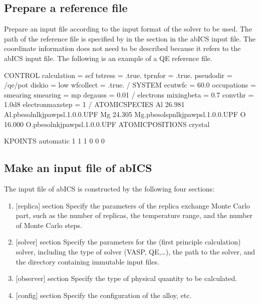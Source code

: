 \documentclass[letterpaper,10pt,english]{sphinxmanual}
\begin{document}
\subsection{Prepare a reference file}
\label{\detokenize{how_to_use/basic_usage:prepare-a-reference-file}}
Prepare an input file according to the input format of the solver to be used.
The path of the reference file is specified by  in the \sphinxcode{{[}solver{]}} section in the abICS input file.
The coordinate information does not need to be described because it refers to the abICS input file.
The following is an example of a QE reference file.

\begin{sphinxVerbatim}[commandchars=\\\{\}]
\PYGZam{}CONTROL
  calculation = \PYGZsq{}scf\PYGZsq{}
  tstress = .true.
  tprnfor = .true.
  pseudo\PYGZus{}dir = \PYGZsq{}\PYGZti{}/qe/pot\PYGZsq{}
  disk\PYGZus{}io = \PYGZsq{}low\PYGZsq{}
  wf\PYGZus{}collect = .true.
/
\PYGZam{}SYSTEM
  ecutwfc      =  60.0
  occupations  = \PYGZdq{}smearing\PYGZdq{}
  smearing     = \PYGZdq{}m\PYGZhy{}p\PYGZdq{}
  degauss      = 0.01
/
\PYGZam{}electrons
  mixing\PYGZus{}beta = 0.7
  conv\PYGZus{}thr = 1.0d\PYGZhy{}8
  electron\PYGZus{}maxstep = 1
/
ATOMIC\PYGZus{}SPECIES
Al 26.981 Al.pbesol\PYGZhy{}nl\PYGZhy{}kjpaw\PYGZus{}psl.1.0.0.UPF
Mg 24.305 Mg.pbesol\PYGZhy{}spnl\PYGZhy{}kjpaw\PYGZus{}psl.1.0.0.UPF
O  16.000 O.pbesol\PYGZhy{}n\PYGZhy{}kjpaw\PYGZus{}psl.1.0.0.UPF
ATOMIC\PYGZus{}POSITIONS crystal

K\PYGZus{}POINTS automatic
1 1 1 0 0 0
\end{sphinxVerbatim}


\subsection{Make an input file of abICS}
\label{\detokenize{how_to_use/basic_usage:make-an-input-file-of-abics}}
The input file of abICS is constructed by the following four sections:
\begin{enumerate}
\item {} 
{[}replica{]} section
Specify the parameters of the replica exchange Monte Carlo part, such as the number of replicas, the temperature range, and the number of Monte Carlo steps.

\item {} 
{[}solver{]} section
Specify the parameters for the (first principle calculation) solver, including the type of solver (VASP, QE,…), the path to the solver, and the directory containing immutable input files.

\item {} 
{[}observer{]} section
Specify the type of physical quantity to be calculated.

\item {} 
{[}config{]} section
Specify the configuration of the alloy, etc.

\end{enumerate}
\end{document}
